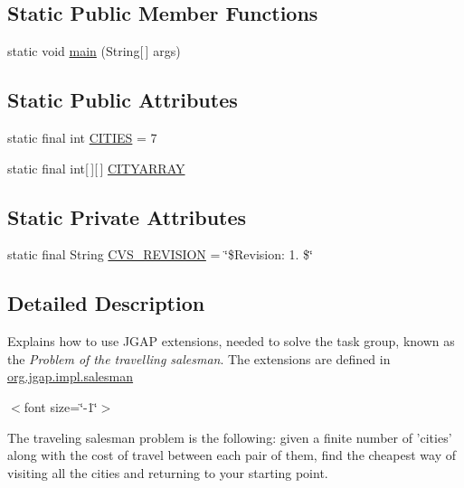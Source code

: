 \subsection*{Static Public Member Functions}
\begin{DoxyCompactItemize}
\item 
static void \hyperlink{classexamples_1_1salesman_1_1_travelling_salesman_a76c16e34c9e44697cf21a362a352d1d1}{main} (String\mbox{[}$\,$\mbox{]} args)
\end{DoxyCompactItemize}
\subsection*{Static Public Attributes}
\begin{DoxyCompactItemize}
\item 
static final int \hyperlink{classexamples_1_1salesman_1_1_travelling_salesman_a0f51860b5f44013db47fc58ce9b210e1}{C\-I\-T\-I\-E\-S} = 7
\item 
static final int\mbox{[}$\,$\mbox{]}\mbox{[}$\,$\mbox{]} \hyperlink{classexamples_1_1salesman_1_1_travelling_salesman_acd4f8e271c8cd63d71a6ffb953370232}{C\-I\-T\-Y\-A\-R\-R\-A\-Y}
\end{DoxyCompactItemize}
\subsection*{Static Private Attributes}
\begin{DoxyCompactItemize}
\item 
static final String \hyperlink{classexamples_1_1salesman_1_1_travelling_salesman_a82d86ae3a72943681e09da420164b6de}{C\-V\-S\-\_\-\-R\-E\-V\-I\-S\-I\-O\-N} = \char`\"{}\$Revision\-: 1. \$\char`\"{}
\end{DoxyCompactItemize}


\subsection{Detailed Description}
Explains how to use J\-G\-A\-P extensions, needed to solve the task group, known as the {\itshape Problem of the travelling salesman}. The extensions are defined in \hyperlink{namespaceorg_1_1jgap_1_1impl_1_1salesman}{org.\-jgap.\-impl.\-salesman}

$<$font size=\char`\"{}-\/1\char`\"{}$>$

The traveling salesman problem is the following\-: given a finite number of 'cities' along with the cost of travel between each pair of them, find the cheapest way of visiting all the cities and returning to your starting point. 

